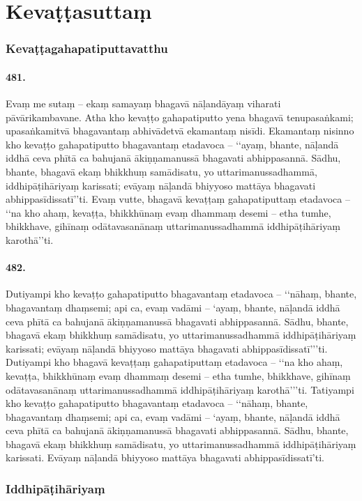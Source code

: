 \section{Kevaṭṭasuttaṃ}

\subsubsection{Kevaṭṭagahapatiputtavatthu}

\paragraph{481.} Evaṃ me sutaṃ – ekaṃ samayaṃ bhagavā nāḷandāyaṃ viharati pāvārikambavane. Atha kho kevaṭṭo gahapatiputto yena bhagavā tenupasaṅkami; upasaṅkamitvā bhagavantaṃ abhivādetvā ekamantaṃ nisīdi. Ekamantaṃ nisinno kho kevaṭṭo gahapatiputto bhagavantaṃ etadavoca – ‘‘ayaṃ, bhante, nāḷandā iddhā ceva phītā ca bahujanā ākiṇṇamanussā bhagavati abhippasannā. Sādhu, bhante, bhagavā ekaṃ bhikkhuṃ samādisatu, yo uttarimanussadhammā, iddhipāṭihāriyaṃ karissati; evāyaṃ nāḷandā bhiyyoso mattāya bhagavati abhippasīdissatī’’ti. Evaṃ vutte, bhagavā kevaṭṭaṃ gahapatiputtaṃ etadavoca – ‘‘na kho ahaṃ, kevaṭṭa, bhikkhūnaṃ evaṃ dhammaṃ desemi – etha tumhe, bhikkhave, gihīnaṃ odātavasanānaṃ uttarimanussadhammā iddhipāṭihāriyaṃ karothā’’ti.

\paragraph{482.} Dutiyampi kho kevaṭṭo gahapatiputto bhagavantaṃ etadavoca – ‘‘nāhaṃ, bhante, bhagavantaṃ dhaṃsemi; api ca, evaṃ vadāmi – ‘ayaṃ, bhante, nāḷandā iddhā ceva phītā ca bahujanā ākiṇṇamanussā bhagavati abhippasannā. Sādhu, bhante, bhagavā ekaṃ bhikkhuṃ samādisatu, yo uttarimanussadhammā iddhipāṭihāriyaṃ karissati; evāyaṃ nāḷandā bhiyyoso mattāya bhagavati abhippasīdissatī’’’ti. Dutiyampi kho bhagavā kevaṭṭaṃ gahapatiputtaṃ etadavoca – ‘‘na kho ahaṃ, kevaṭṭa, bhikkhūnaṃ evaṃ dhammaṃ desemi – etha tumhe, bhikkhave, gihīnaṃ odātavasanānaṃ uttarimanussadhammā iddhipāṭihāriyaṃ karothā’’’ti. Tatiyampi kho kevaṭṭo gahapatiputto bhagavantaṃ etadavoca – ‘‘nāhaṃ, bhante, bhagavantaṃ dhaṃsemi; api ca, evaṃ vadāmi – ‘ayaṃ, bhante, nāḷandā iddhā ceva phītā ca bahujanā ākiṇṇamanussā bhagavati abhippasannā. Sādhu, bhante, bhagavā ekaṃ bhikkhuṃ samādisatu, yo uttarimanussadhammā iddhipāṭihāriyaṃ karissati. Evāyaṃ nāḷandā bhiyyoso mattāya bhagavati abhippasīdissatī’ti.

\subsubsection{Iddhipāṭihāriyaṃ}

